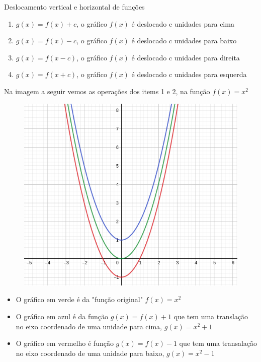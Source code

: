 \begin{multicols*}{2}
    Deslocamento vertical e horizontal de funções
    \begin{enumerate}
        \item $g(x) = f(x) + c$, o gráfico $f(x)$ é deslocado c unidades para cima
        \item $g(x) = f(x) - c $, o gráfico $f(x)$ é deslocado c unidades para baixo
        \item $g(x) = f(x - c) $, o gráfico $f(x)$ é deslocado c unidades para direita
        \item $g(x) = f(x + c) $, o gráfico $f(x)$ é deslocado c unidades para esquerda
    \end{enumerate}
    Na imagem a seguir vemos as operações dos items 1 e 2, na função $f(x) = x^2$
    \begin{figure}[H]
        \centering
        \includegraphics[scale=0.4]{assets/rafael/img7.png}
    \end{figure}
    \begin{itemize}
        \item O gráfico em verde é da "função original" $f(x) = x^2$
        \item O gráfico em azul é da função $g(x) = f(x) + 1$ que tem uma translação no eixo 							coordenado de uma unidade para cima, $g(x) = x^2 + 1 $
        \item O gráfico em vermelho é função $g(x) = f(x) - 1$ que tem uma transalação no eixo 							coordenado de uma unidade para baixo, $g(x) = x^2 -1$
    \end{itemize}

\end{multicols*}

